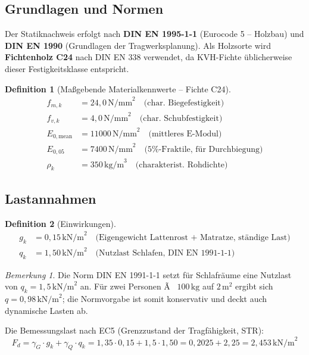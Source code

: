 ﻿\documentclass[12pt,a4paper]{article}
\theoremstyle{definition}
\newtheorem{definition}{Definition}
\theoremstyle{plain}
\theoremstyle{remark}
\newtheorem{bemerkung}{Bemerkung}
\begin{document}
\subsection{Grundlagen und Normen}

Der Statiknachweis erfolgt nach \textbf{DIN EN 1995-1-1} (Eurocode 5 -- Holzbau)
und \textbf{DIN EN 1990} (Grundlagen der Tragwerksplanung). Als Holzsorte wird
\textbf{Fichtenholz C24} nach DIN EN 338 verwendet, da KVH-Fichte üblicherweise
dieser Festigkeitsklasse entspricht.

\begin{definition}[Maßgebende Materialkennwerte -- Fichte C24]
\begin{align*}
f_{m,k}   &= 24{,}0\,\text{N/mm}^2 \quad \text{(char. Biegefestigkeit)} \\
f_{v,k}   &= 4{,}0\,\text{N/mm}^2  \quad \text{(char. Schubfestigkeit)}  \\
E_{0,\text{mean}} &= 11000\,\text{N/mm}^2 \quad \text{(mittleres E-Modul)} \\
E_{0,05}  &= 7400\,\text{N/mm}^2   \quad \text{(5\%-Fraktile, für Durchbiegung)} \\
\rho_k    &= 350\,\text{kg/m}^3    \quad \text{(charakterist. Rohdichte)}
\end{align*}
\end{definition}

\subsection{Lastannahmen}

\begin{definition}[Einwirkungen]
\begin{align*}
g_k  &= 0{,}15\,\text{kN/m}^2 \quad \text{(Eigengewicht Lattenrost + Matratze, ständige Last)}\\
q_k  &= 1{,}50\,\text{kN/m}^2 \quad \text{(Nutzlast Schlafen, DIN EN 1991-1-1)}
\end{align*}
\end{definition}

\begin{bemerkung}
Die Norm DIN EN 1991-1-1 setzt für Schlafräume eine Nutzlast von $q_k = 1{,}5\,\text{kN/m}^2$ an.
Für zwei Personen Ã  $100\,\text{kg}$ auf $2\,\text{m}^2$ ergibt sich $q = 0{,}98\,\text{kN/m}^2$;
die Normvorgabe ist somit konservativ und deckt auch dynamische Lasten ab.
\end{bemerkung}

Die Bemessungslast nach EC5 (Grenzzustand der Tragfähigkeit, STR):
\begin{equation}
  F_d = \gamma_G \cdot g_k + \gamma_Q \cdot q_k
      = 1{,}35 \cdot 0{,}15 + 1{,}5 \cdot 1{,}50
      = 0{,}2025 + 2{,}25
      = 2{,}453\,\text{kN/m}^2
\end{equation}
\end{document}
